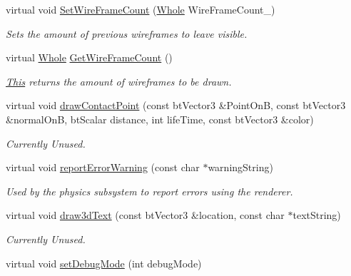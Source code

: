 \begin{DoxyCompactItemize}
virtual void \hyperlink{classphys_1_1debug_1_1InternalDebugDrawer_a76922fda7bb3b59d301e50d67e4f3c72}{SetWireFrameCount} (\hyperlink{namespacephys_a460f6bc24c8dd347b05e0366ae34f34a}{Whole} WireFrameCount\_\-)
\begin{DoxyCompactList}\small\item\em Sets the amount of previous wireframes to leave visible. \item\end{DoxyCompactList}\item 
virtual \hyperlink{namespacephys_a460f6bc24c8dd347b05e0366ae34f34a}{Whole} \hyperlink{classphys_1_1debug_1_1InternalDebugDrawer_aa1666e636e6ff81813c0b1a85d7bc157}{GetWireFrameCount} ()
\begin{DoxyCompactList}\small\item\em \hyperlink{structThis}{This} returns the amount of wireframes to be drawn. \item\end{DoxyCompactList}\item 
virtual void \hyperlink{classphys_1_1debug_1_1InternalDebugDrawer_a8b912aaff8dfd9f4e97ffb2d867121b2}{drawContactPoint} (const btVector3 \&PointOnB, const btVector3 \&normalOnB, btScalar distance, int lifeTime, const btVector3 \&color)
\begin{DoxyCompactList}\small\item\em Currently Unused. \item\end{DoxyCompactList}\item 
virtual void \hyperlink{classphys_1_1debug_1_1InternalDebugDrawer_a4e3b4cbc861f76696b4d32f0cf068ea6}{reportErrorWarning} (const char $\ast$warningString)
\begin{DoxyCompactList}\small\item\em Used by the physics subsystem to report errors using the renderer. \item\end{DoxyCompactList}\item 
virtual void \hyperlink{classphys_1_1debug_1_1InternalDebugDrawer_a1266d3fad8868ade2d515e9c92e76b4a}{draw3dText} (const btVector3 \&location, const char $\ast$textString)
\begin{DoxyCompactList}\small\item\em Currently Unused. \item\end{DoxyCompactList}\item 
virtual void \hyperlink{classphys_1_1debug_1_1InternalDebugDrawer_a63059b273ed6031a393b2d994b820bcc}{setDebugMode} (int debugMode)

\end{DoxyCompactItemize}
